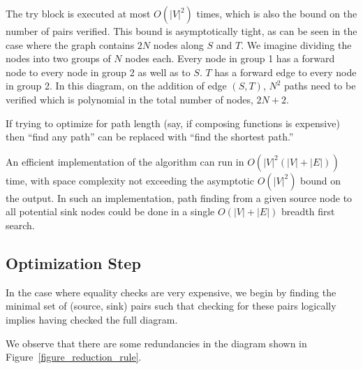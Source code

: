\documentclass[sigplan,review,anonymous]{acmart}
\begin{document}
{The try block is executed at most $O(|V|^2)$ times, which is also the bound on the number of pairs verified.
%
This bound is asymptotically tight, as can be seen in the case where the graph contains $2N$ nodes along $S$ and $T$.
We imagine dividing the nodes into two groups of $N$ nodes each. Every node in group 1 has a forward node to every node in group 2 as well as to $S$. $T$ has a forward edge to every node in group 2. In this diagram, on the addition of edge $(S, T)$, $N^2$ paths need to be verified which is polynomial in the total number of nodes, $2N+2$.

If trying to optimize for path length (say, if composing functions is expensive) then ``find any path'' can be replaced with ``find the shortest path.''

An efficient implementation of the algorithm can run in $O(|V|^2(|V|+|E|))$ time, with space complexity not exceeding the asymptotic $O(|V|^2)$ bound on the output.
In such an implementation, path finding from a given source node to all potential sink nodes could be done in a single $O(|V|+|E|)$ breadth first search.

\subsection{Optimization Step}

In the case where equality checks are very expensive, we begin by finding the minimal set of (source, sink) pairs such that checking for these pairs logically implies having checked the full diagram.

We observe that there are some redundancies in the diagram shown in Figure~\ref{figure_reduction_rule}.  

}
\end{document}
